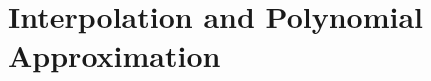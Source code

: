 \setcounter{section}{2}



\section{Interpolation and Polynomial Approximation}



%



%



%



%



%


%



%


%






%







